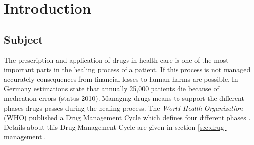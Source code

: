 \chapter{Introduction}
\label{cha:introduction-1}

\section{Subject}
\label{sec:subject}

The prescription and application of drugs in health care is one of the most important parts in the healing process of  a patient.
If this process is not managed accurately consequences from financial losses to  human harms are possible.
In Germany estimations state that annually 25,000 patients die because of medication errors \cite{pharzeit10} (status 2010).
Managing drugs means to support the different phases drugs passes during the healing process.
The \textit{World Health Organization} (WHO) published a Drug Management Cycle which defines four different phases \cite{who2004}.
Details about this Drug Management Cycle are given in section \ref{sec:drug-management}. 

